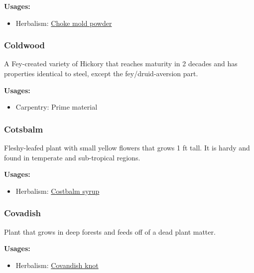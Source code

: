 \textbf{Usages:}

\begin{itemize}[noitemsep]
\item[] Herbalism: \hyperref[Choke mold powder]{Choke mold powder}
\end{itemize}

\subsubsection{Coldwood}
\label{Coldwood}

A Fey-created variety of Hickory that reaches maturity in 2 decades and has properties identical to steel, except the fey/druid-aversion part.

\vspace{5mm}

\textbf{Usages:}

\begin{itemize}[noitemsep]
\item[] Carpentry: Prime material
\end{itemize}

\subsubsection{Cotsbalm}
\label{Cotsbalm}

Fleshy-leafed plant with small yellow flowers that grows 1 ft tall. It is hardy and found in temperate and sub-tropical regions.

\vspace{5mm}

\textbf{Usages:}

\begin{itemize}[noitemsep]
\item[] Herbalism: \hyperref[Costbalm syrup]{Costbalm syrup}
\end{itemize}

\subsubsection{Covadish}
\label{Covadish}

Plant that grows in deep forests and feeds off of a dead plant matter.

\vspace{5mm}

\textbf{Usages:}

\begin{itemize}[noitemsep]
\item[] Herbalism: \hyperref[Covandish knot]{Covandish knot}
\end{itemize}

